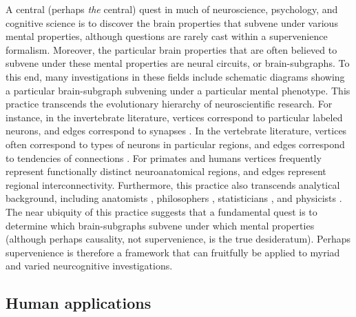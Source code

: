 \documentclass{article}
\newcommand{\mB}{\mathcal{B}}
\newcommand{\mM}{\mathcal{M}}
\newcommand{\PP}{\mathbb{P}}           %
\newcommand{\MeB}{\mM \overset{\varepsilon}{{\sim}}_{\PP} \mB}
\begin{document}
A central (perhaps \emph{the} central) quest in much of neuroscience, psychology, and cognitive science is to discover the brain properties that subvene under various mental properties, although questions are rarely cast within a  supervenience formalism.  Moreover, the particular brain properties that are often believed to subvene under these mental properties are neural circuits, or brain-subgraphs.  To this end, many investigations in these fields include schematic diagrams showing a particular brain-subgraph subvening under a particular mental phenotype. This practice transcends the evolutionary hierarchy of neuroscientific research.  For instance, in the invertebrate literature, vertices correspond to particular labeled neurons, and edges correspond to synapses \cite{NorthGreenspan07}.  In the vertebrate literature, vertices often correspond to types of neurons in particular regions, and edges correspond to tendencies of connections \cite{Shepherd04}.  For primates \cite{Felleman_VanEssen91} and humans \cite{Mori05} vertices frequently represent functionally distinct neuroanatomical regions, and edges represent regional interconnectivity. Furthermore, this practice also transcends analytical background, including anatomists \cite{Abeles91}, philosophers \cite{Koch_Davis94}, statisticians \cite{Rao_Lewicki02}, and physicists \cite{Chow_Dalibard03}.  The near ubiquity of this practice suggests that a fundamental quest is to determine which brain-subgraphs subvene under which mental properties (although perhaps causality, not supervenience, is the true desideratum).  Perhaps supervenience is therefore a framework that can fruitfully be applied to myriad and varied neurcognitive investigations.




% 
% 

\subsection{Human applications} %
\label{par:human_applications}
\end{document}
